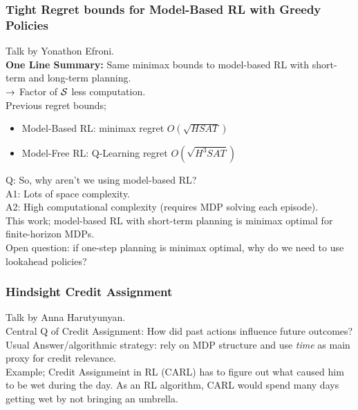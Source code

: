 \subsubsection{Tight Regret bounds for Model-Based RL with Greedy Policies}

Talk by Yonathon Efroni. \\

{\bf One Line Summary:} Same minimax bounds to model-based RL with short-term and long-term planning. \\

$\rightarrow$ Factor of $\mathcal{S}$ less computation. \\

Previous regret bounds;
\begin{itemize}
    \item Model-Based RL: minimax regret $O(\sqrt{HSAT})$
    \item Model-Free RL: Q-Learning regret $O(\sqrt{H^3SAT})$
\end{itemize}

Q: So, why aren't we using model-based RL? \\

A1: Lots of space complexity. \\
A2: High computational complexity (requires MDP solving each episode). \\

This work; model-based RL with short-term planning is minimax optimal for finite-horizon MDPs. \\

Open question: if one-step planning is minimax optimal, why do we need to use lookahead policies?

\subsubsection{Hindsight Credit Assignment}

Talk by Anna Harutyunyan. \\

Central Q of Credit Assignment: How did past actions influence future outcomes? \\

Usual Answer/algorithmic strategy: rely on MDP structure and use {\it time} as main proxy for credit relevance. \\

Example; Credit Assignmeint in RL (CARL) has to figure out what caused him to be wet during the day. As an RL algorithm, CARL would spend many days getting wet by not bringing an umbrella. \\


